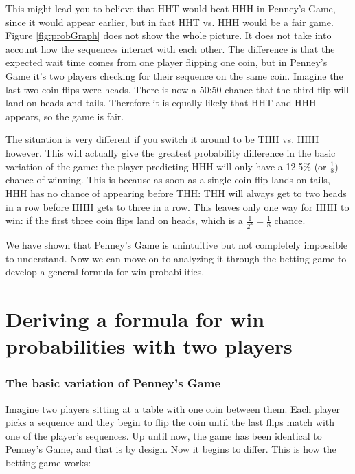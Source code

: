 \documentclass[english,12pt,a4paper,final]{article}
\begin{document}
This might lead you to believe that HHT would beat HHH in Penney's Game, since it would appear earlier, but in fact HHT vs. HHH would be a fair game. Figure \ref{fig:probGraph} does not show the whole picture. It does not take into account how the sequences interact with each other. The difference is that the expected wait time comes from one player flipping one coin, but in Penney's Game it's two players checking for their sequence on the same coin. Imagine the last two coin flips were heads. There is now a 50:50 chance that the third flip will land on heads and tails. Therefore it is equally likely that HHT and HHH appears, so the game is fair.

The situation is very different if you switch it around to be THH vs. HHH however. This will actually give the greatest probability difference in the basic variation of the game: the player predicting HHH will only have a 12.5\% (or $\frac{1}{8}$) chance of winning. This is because as soon as a single coin flip lands on tails, HHH has no chance of appearing before THH: THH will always get to two heads in a row before HHH gets to three in a row. This leaves only one way for HHH to win: if the first three coin flips land on heads, which is a $\frac{1}{2^3} = \frac{1}{8}$ chance.

We have shown that Penney's Game is unintuitive but not completely impossible to understand. Now we can move on to analyzing it through the betting game to develop a general formula for win probabilities.

\part{Deriving a formula for win probabilities with two players}

\section{The basic variation of Penney's Game}

Imagine two players sitting at a table with one coin between them. Each player picks a sequence and they begin to flip the coin until the last flips match with one of the player's sequences. Up until now, the game has been identical to Penney's Game, and that is by design. Now it begins to differ. This is how the betting game works:
\end{document}
